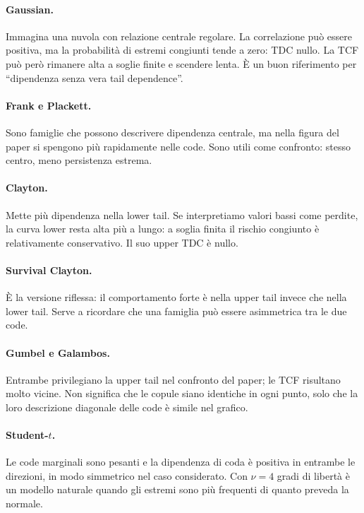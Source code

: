 \documentclass[11pt,a4paper]{article}
\begin{document}
\paragraph{Gaussian.} Immagina una nuvola con relazione centrale regolare. La
correlazione può essere positiva, ma la probabilità di estremi congiunti tende
a zero: TDC nullo. La TCF può però rimanere alta a soglie finite e scendere
lenta. È un buon riferimento per ``dipendenza senza vera tail dependence''.

\paragraph{Frank e Plackett.} Sono famiglie che possono descrivere dipendenza
centrale, ma nella figura del paper si spengono più rapidamente nelle code.
Sono utili come confronto: stesso centro, meno persistenza estrema.

\paragraph{Clayton.} Mette più dipendenza nella lower tail. Se interpretiamo
valori bassi come perdite, la curva lower resta alta più a lungo: a soglia
finita il rischio congiunto è relativamente conservativo. Il suo upper TDC è
nullo.

\paragraph{Survival Clayton.} È la versione riflessa: il comportamento forte è
nella upper tail invece che nella lower tail. Serve a ricordare che una famiglia
può essere asimmetrica tra le due code.

\paragraph{Gumbel e Galambos.} Entrambe privilegiano la upper tail nel confronto
del paper; le TCF risultano molto vicine. Non significa che le copule siano
identiche in ogni punto, solo che la loro descrizione diagonale delle code è
simile nel grafico.

\paragraph{Student-$t$.} Le code marginali sono pesanti e la dipendenza di coda
è positiva in entrambe le direzioni, in modo simmetrico nel caso considerato.
Con $\nu=4$ gradi di libertà è un modello naturale quando gli estremi sono più
frequenti di quanto preveda la normale.
\end{document}
